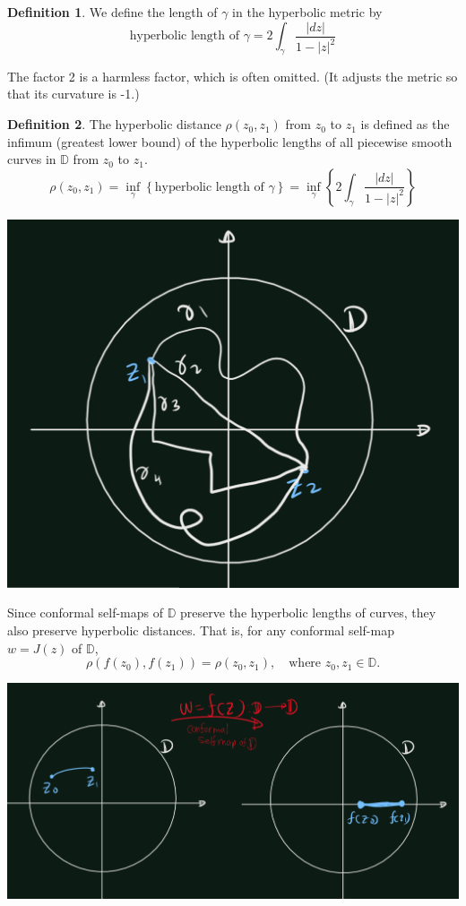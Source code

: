 \documentclass[
]{book}
\theoremstyle{definition}
\newtheorem{definition}{Definition}[chapter]
\theoremstyle{definition}
\theoremstyle{definition}
\theoremstyle{definition}
\theoremstyle{remark}
\begin{document}
\begin{definition}
\protect\hypertarget{def:unnamed-chunk-33}{}\label{def:unnamed-chunk-33}We define the length of \(\gamma\) in the hyperbolic metric by
\[\text{hyperbolic length of } \gamma =2\int_{\gamma} \frac{|dz|}{1-|z|^2}\]
\end{definition}

The factor 2 is a harmless factor, which is often omitted. (It adjusts the
metric so that its curvature is -1.)

\begin{definition}
\protect\hypertarget{def:unnamed-chunk-34}{}\label{def:unnamed-chunk-34}The hyperbolic distance \(\rho(z_0, z_1)\) from \(z_0\) to \(z_1\) is defined as the infimum (greatest lower bound) of the hyperbolic lengths of all piecewise smooth curves in \(\mathbb{D}\) from \(z_0\) to \(z_1\).
\[\rho(z_0, z_1)
  =\inf_\gamma\left\{\text{hyperbolic length of } \gamma \right\}
  =\inf_\gamma\left\{2\int_{\gamma} \frac{|dz|}{1-|z|^2}\right\}\]
\end{definition}

\includegraphics[width=14.76in]{figures/Riemann_Mapping_Therom/fig1}

Since conformal self-maps of \(\mathbb{D}\) preserve the hyperbolic lengths of curves, they also preserve hyperbolic distances. That is, for any conformal self-map \(w = J(z)\) of \(\mathbb{D}\),
\[ \rho(f(z_0), f(z_1)) = \rho(z_0, z_1), \quad \text{where } z_0, z_1 \in \mathbb{D}. \]

\includegraphics[width=23.78in]{figures/Riemann_Mapping_Therom/fig2}
\end{document}
